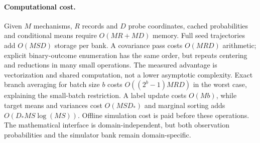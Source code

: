 \paragraph{Computational cost.}
Given $M$ mechanisms, $R$ records and $D$ probe coordinates, cached probabilities and conditional means require $O(MR+MD)$ memory. Full seed trajectories add $O(MSD)$ storage per bank. A covariance pass costs $O(MRD)$ arithmetic; explicit binary-outcome enumeration has the same order, but repeats centering and reductions in many small operations. The measured advantage is vectorization and shared computation, not a lower asymptotic complexity. Exact branch averaging for batch size $b$ costs $O((2^b-1)MRD)$ in the worst case, explaining the small-batch restriction. A label update costs $O(Mb)$, while target means and variances cost $O(MSD_*)$ and marginal sorting adds $O(D_*MS\log(MS))$. Offline simulation cost is paid before these operations. The mathematical interface is domain-independent, but both observation probabilities and the simulator bank remain domain-specific.
